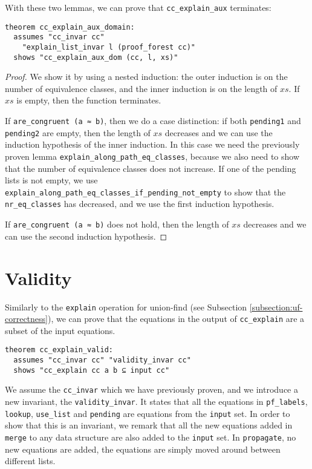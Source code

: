 With these two lemmas, we can prove that \lstinline{cc_explain_aux} terminates:

\begin{lstlisting}
theorem cc_explain_aux_domain:
  assumes "cc_invar cc"
    "explain_list_invar l (proof_forest cc)"
  shows "cc_explain_aux_dom (cc, l, xs)"
\end{lstlisting}


\begin{proof}
We show it by using a nested induction: the outer induction is on the number of equivalence classes, and the inner induction is on the length of $xs$.
If $xs$ is empty, then the function terminates.

If \lstinline{are_congruent (a ≈ b)}, then we do a case distinction: if both \lstinline{pending1} and \lstinline{pending2} are empty, then the length of $xs$ decreases and we can use the induction hypothesis of the inner induction. In this case we need the previously proven lemma \lstinline{explain_along_path_eq_classes}, because we also need to show that the number of equivalence classes does not increase. If one of the pending lists is not empty, we use \lstinline{explain_along_path_eq_classes_if_pending_not_empty} to show that the \lstinline{nr_eq_classes} has decreased, and we use the first induction hypothesis.

If \lstinline{are_congruent (a ≈ b)} does not hold, then the length of $xs$ decreases and we can use the second induction hypothesis.
\end{proof}


\section{Validity}

Similarly to the \lstinline{explain} operation for union-find (see Subsection \ref{subsection:uf-correctness}), we can prove that the equations in the output of \lstinline{cc_explain} are a subset of the input equations.

\begin{lstlisting}
theorem cc_explain_valid:
  assumes "cc_invar cc" "validity_invar cc"
  shows "cc_explain cc a b ⊆ input cc"
\end{lstlisting}

We assume the \lstinline{cc_invar} which we have previously proven, and we introduce a new invariant, the \lstinline{validity_invar}. It states that all the equations in \lstinline{pf_labels}, \lstinline{lookup}, \lstinline{use_list} and \lstinline{pending} are equations from the \lstinline{input} set. In order to show that this is an invariant, we remark that all the new equations added in \lstinline{merge} to any data structure are also added to the \lstinline{input} set. In \lstinline{propagate}, no new equations are added, the equations are simply moved around between different lists.

